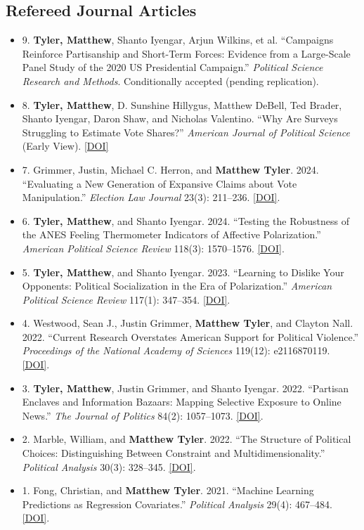 \documentclass[11pt,a4paper]{article}
\newenvironment{publicationlist}{%
  \begin{itemize}[leftmargin=2.1em,labelsep=0.45em,
                   topsep=0.3em,itemsep=0.6em,parsep=0pt]
}{\end{itemize}}
\newcommand{\doi}[1]{\href{https://doi.org/#1}{[DOI]}}
\begin{document}
\subsection*{Refereed Journal Articles}
\begin{publicationlist}
\item [9.] \textbf{Tyler, Matthew}, Shanto Iyengar, Arjun Wilkins, et al.
  ``Campaigns Reinforce Partisanship and Short-Term Forces: Evidence
  from a Large-Scale Panel Study of the 2020 US Presidential Campaign.'' \emph{Political Science Research and Methods}. Conditionally accepted (pending replication).

\item[8.] \textbf{Tyler, Matthew}, D. Sunshine Hillygus, Matthew DeBell,
  Ted Brader, Shanto Iyengar, Daron Shaw, and Nicholas Valentino.
  ``Why Are Surveys Struggling to Estimate Vote Shares?'' \emph{American Journal of Political Science} (Early View). \doi{10.1111/ajps.70051}

\item[7.] Grimmer, Justin, Michael C. Herron, and \textbf{Matthew Tyler}.
  2024. ``Evaluating a New Generation of Expansive Claims about Vote
  Manipulation.'' \emph{Election Law Journal} 23(3): 211--236.
  \doi{10.1089/elj.2022.0070}.

\item[6.] \textbf{Tyler, Matthew}, and Shanto Iyengar.
  2024. ``Testing the Robustness of the ANES Feeling Thermometer
  Indicators of Affective Polarization.''
  \emph{American Political Science Review} 118(3): 1570--1576.
  \doi{10.1017/S0003055423001302}.

\item[5.] \textbf{Tyler, Matthew}, and Shanto Iyengar.
  2023. ``Learning to Dislike Your Opponents: Political Socialization
  in the Era of Polarization.''
  \emph{American Political Science Review} 117(1): 347--354.
  \doi{10.1017/S000305542200048X}.

\item[4.] Westwood, Sean J., Justin Grimmer, \textbf{Matthew Tyler},
  and Clayton Nall. 2022.
  ``Current Research Overstates American Support for Political Violence.''
  \emph{Proceedings of the National Academy of Sciences}
  119(12): e2116870119. \doi{10.1073/pnas.2116870119}.

\item[3.] \textbf{Tyler, Matthew}, Justin Grimmer, and Shanto Iyengar.
  2022. ``Partisan Enclaves and Information Bazaars: Mapping Selective
  Exposure to Online News.'' \emph{The Journal of Politics}
  84(2): 1057--1073. \doi{10.1086/716950}.

\item[2.] Marble, William, and \textbf{Matthew Tyler}.
  2022. ``The Structure of Political Choices: Distinguishing Between
  Constraint and Multidimensionality.''
  \emph{Political Analysis} 30(3): 328--345.
  \doi{10.1017/pan.2021.3}.

\item[1.] Fong, Christian, and \textbf{Matthew Tyler}.
  2021. ``Machine Learning Predictions as Regression Covariates.''
  \emph{Political Analysis} 29(4): 467--484.
  \doi{10.1017/pan.2020.38}.
\end{publicationlist}
\end{document}

